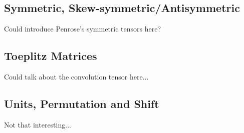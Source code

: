 \subsection{Symmetric, Skew-symmetric/Antisymmetric}
\label{sec:symmetric}

Could introduce Penrose's symmetric tensors here?

\subsection{Toeplitz Matrices}
Could talk about the convolution tensor here...
\subsection{Units, Permutation and Shift}
Not that interesting...

